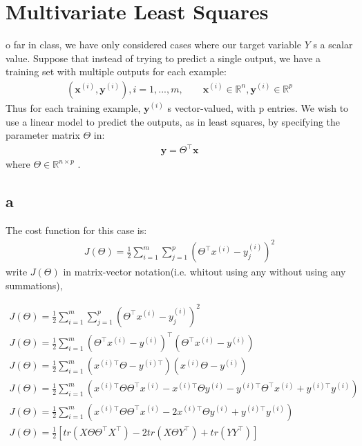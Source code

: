 \documentclass[12pt]{article}
\begin{document}
\section{Multivariate Least Squares}
o far in class, we have only considered cases where our target variable $Y$ s a scalar value. Suppose that instead of trying to predict a single output, we have a training set with multiple outputs for each example:
\begin{gather*}
    (\mathbf{x}^{(i)} , \mathbf{y}^{(i)}) , i = 1, . . . , m, \quad \quad \mathbf{x}^{(i)} \in \mathbb{R}^{n}, \mathbf{y}^{(i)} \in \mathbb{R}^{p}
\end{gather*}
Thus for each training example, $\mathbf{y}^{(i)}$ s vector-valued, with p entries. We wish to use a linear model to predict the outputs, as in least squares, by specifying the parameter matrix $\Theta$ in:
\begin{gather*}
    \mathbf{y} = \Theta^\top \mathbf{x}
\end{gather*}
where $\Theta \in \mathbb{R}^{n \times p}$ .
\subsection{a}
The cost function for this case is:
\begin{gather*}
    J(\Theta) = \frac{1}{2} \sum_{i=1}^{m} \sum_{j=1}^{p} (\Theta^\top x^{(i)} - y_j^{(i)})^2
\end{gather*}
write $J(\Theta)$ in matrix-vector notation(i.e. whitout using any without using any summations),
\begin{qsolve}
    \begin{gather*}
        J(\Theta) = \frac{1}{2} \sum_{i=1}^{m} \sum_{j=1}^{p} (\Theta^\top x^{(i)} - y_j^{(i)})^2 \\
        J(\Theta) = \frac{1}{2} \sum_{i=1}^{m} (\Theta^\top x^{(i)} - y^{(i)})^\top (\Theta^\top x^{(i)} - y^{(i)}) \\
        J(\Theta) = \frac{1}{2} \sum_{i=1}^{m} (x^{(i)\top} \Theta - y^{(i)\top}) (x^{(i)} \Theta - y^{(i)}) \\
        J(\Theta) = \frac{1}{2} \sum_{i=1}^{m} (x^{(i)\top} \Theta \Theta^\top x^{(i)} - x^{(i)\top} \Theta y^{(i)} - y^{(i)\top} \Theta^\top x^{(i)} + y^{(i)\top} y^{(i)}) \\
        J(\Theta) = \frac{1}{2} \sum_{i=1}^{m} (x^{(i)\top} \Theta \Theta^\top x^{(i)} - 2 x^{(i)\top} \Theta y^{(i)} + y^{(i)\top} y^{(i)}) \\
        J(\Theta) = \frac{1}{2}  [tr(X \Theta \Theta^\top X^\top) - 2 tr(X \Theta Y^\top) + tr(Y Y^\top)] \\
    \end{gather*}
\end{qsolve}
\end{document}
